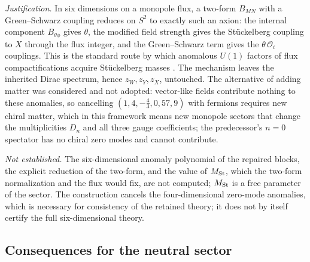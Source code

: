 \documentclass[11pt,letterpaper]{article}
\begin{document}
\emph{Justification.} In six dimensions on a monopole flux, a two-form $B_{MN}$ with a Green--Schwarz coupling \cite{GS} reduces on $S^2$ to exactly such an axion: the internal component $B_{\theta\phi}$ gives $\theta$, the modified field strength gives the Stückelberg coupling to $X$ through the flux integer, and the Green--Schwarz term gives the $\theta\,\mathcal O_i$ couplings. This is the standard route by which anomalous $U(1)$ factors of flux compactifications acquire Stückelberg masses \cite{RSSS85,ABDK,CIK}. The mechanism leaves the inherited Dirac spectrum, hence $z_W,z_Y,z_X$, untouched. The alternative of adding matter was considered and not adopted: vector-like fields contribute nothing to these anomalies, so cancelling $(1,4,-\tfrac43,0,57,9)$ with fermions requires new chiral matter, which in this framework means new monopole sectors that change the multiplicities $D_n$ and all three gauge coefficients; the predecessor's $n=0$ spectator has no chiral zero modes and cannot contribute.

\emph{Not established.} The six-dimensional anomaly polynomial of the repaired blocks, the explicit reduction of the two-form, and the value of $M_{\rm St}$, which the two-form normalization and the flux would fix, are not computed; $M_{\rm St}$ is a free parameter of the sector. The construction cancels the four-dimensional zero-mode anomalies, which is necessary for consistency of the retained theory; it does not by itself certify the full six-dimensional theory.

\subsection{Consequences for the neutral sector}
\end{document}
